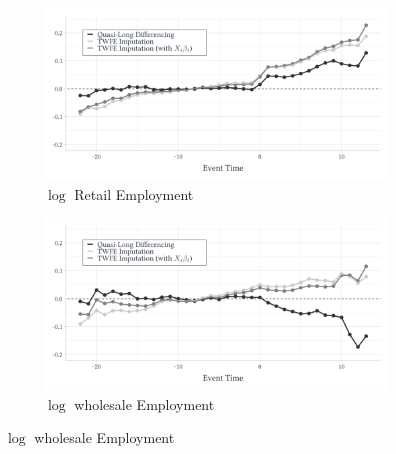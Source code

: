 \documentclass[12pt]{article}
\begin{document}
\begin{figure}
\caption{Time-interacted covariates in TWFE model}
\label{fig:walmart_covs}

\begin{center}
\begin{subfigure}[b]{0.75\textwidth}
  \caption{$\log$ Retail Employment}
  \begin{adjustbox}{width=\textwidth, center}
    \includegraphics{figures/retail_covs.pdf}
  \end{adjustbox}
\end{subfigure} 
\end{center}

\begin{center}
\begin{subfigure}[b]{0.75\textwidth}
  \caption{$\log$ wholesale Employment}
  \begin{adjustbox}{width=\textwidth, center}
    \includegraphics{figures/wholesale_covs.pdf} 
  \end{adjustbox}
\end{subfigure}
\end{center}

\end{figure}
\end{document}
